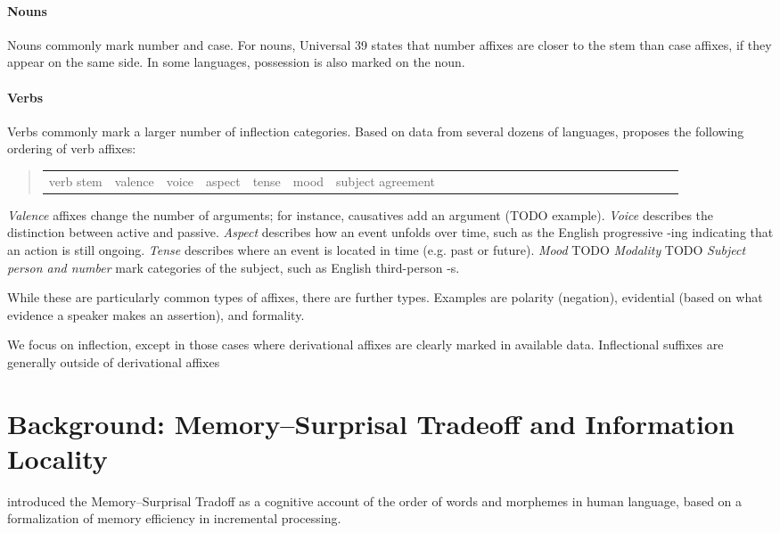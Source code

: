 \documentclass[11pt,letterpaper]{article}
\begin{document}
\paragraph{Nouns}
Nouns commonly mark number and case.
For nouns, \citep[112]{greenberg1963universals} Universal 39 states that number affixes are closer to the stem than case affixes, if they appear on the same side.
In some languages, possession is also marked on the noun.

\paragraph{Verbs}
Verbs commonly mark a larger number of inflection categories.
Based on data from several dozens of languages, \citep{bybee-morphology-1985} proposes the following ordering of verb affixes:
\begin{quote}
\begin{tabular}{llllllllllllllllllllllllll}
verb stem & valence & voice & aspect & tense& mood & subject agreement
\end{tabular}
\end{quote}
\textit{Valence} affixes change the number of arguments; for instance, causatives add an argument (TODO example).
\textit{Voice} describes the distinction between active and passive.
\textit{Aspect} describes how an event unfolds over time, such as the English progressive -ing indicating that an action  is still ongoing.
\textit{Tense} describes where an event is located in time (e.g. past or future).
\textit{Mood} TODO \textit{Modality} TODO
\textit{Subject person and number} mark categories of the subject, such as English third-person -s.

While these are particularly common types of affixes, there are further types.
Examples are polarity (negation), evidential (based on what evidence a speaker makes an assertion), and formality.


We focus on inflection, except in those cases where derivational affixes are clearly marked in available data.
Inflectional suffixes are generally outside of derivational affixes


\section{Background: Memory--Surprisal Tradeoff and Information Locality}

\citet{Hahn2020modeling} introduced the Memory--Surprisal Tradoff as a cognitive account of the order of words and morphemes in human language, based on a formalization of memory efficiency in incremental processing.
\end{document}
